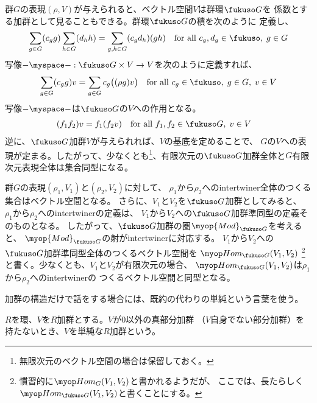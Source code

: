 	群$G$の表現$(\rho,V)$が与えられると、ベクトル空間$V$は群環$\fukuso G$を
	係数とする加群として見ることもできる。群環$\fukuso G$の積を次のように
	定義し、
	\begin{equation*}\begin{split} %
		\sum_{g\in G}(c_gg)\sum_{h\in G}(d_hh)
		&= \sum_{g,h\in G}(c_gd_h)(gh)
		\quad\text{for all }c_g,d_g\in\fukuso,\;g\in G \\
	\end{split}\end{equation*} %
	写像$-\myspace-:\fukuso G\times V\to V$を次のように定義すれば、
	\begin{equation*}\begin{split} %
		\sum_{g\in G}(c_gg)v &= \sum_{g\in G}c_g\bigl((\rho g)v\bigr)
		\quad\text{for all }c_g\in\fukuso,\;g\in G,\;v\in V \\
	\end{split}\end{equation*} %
	写像$-\myspace-$は$\fukuso G$の$V$への作用となる。
	\begin{equation*}\begin{split} %
		(f_1f_2)v &= f_1(f_2v) \quad\text{for all }f_1,f_2\in\fukuso G,\;v\in V
	\end{split}\end{equation*} %
	逆に、$\fukuso G$加群$V$が与えられれば、$V$の基底を定めることで、
	$G$の$V$への表現が定まる。したがって、少なくとも\footnote{
		無限次元のベクトル空間の場合は保留しておく。
	}、有限次元の$\fukuso G$加群全体と$G$有限次元表現全体は集合同型になる。

	群$G$の表現$(\rho_1,V_1)$と$(\rho_2,V_2)$に対して、
	$\rho_1$から$\rho_2$へのintertwiner全体のつくる集合はベクトル空間となる。
	さらに、$V_1$と$V_2$を$\fukuso G$加群としてみると、
	$\rho_1$から$\rho_2$へのintertwinerの定義は、
	$V_1$から$V_2$への$\fukuso G$加群準同型の定義そのものとなる。
	したがって、$\fukuso G$加群の圏$\myop{Mod}_{\fukuso G}$を考えると、
	$\myop{Mod}_{\fukuso G}$の射がintertwinerに対応する。
	$V_1$から$V_2$への$\fukuso G$加群準同型全体のつくるベクトル空間を
	$\Hom_{\fukuso G}(V_1,V_2)$
	\footnote{
		慣習的に$\Hom_G(V_1,V_2)$と書かれるようだが、
		ここでは、長たらしく$\Hom_{\fukuso G}(V_1,V_2)$と書くことにする。
	}と書く。少なくとも、$V_1$と$V_2$が有限次元の場合、
	$\Hom_{\fukuso G}(V_1,V_2)$は$\rho_1$から$\rho_2$へのintertwinerの
	つくるベクトル空間と同型となる。

	加群の構造だけで話をする場合には、既約の代わりの単純という言葉を使う。

	\begin{definition}[単純な加群]\label{def:単純な加群} %
		$R$を環、$V$を$R$加群とする。$V$が$0$以外の真部分加群
		（$V$自身でない部分加群）を持たないとき、$V$を単純な$R$加群という。
	\end{definition} %

